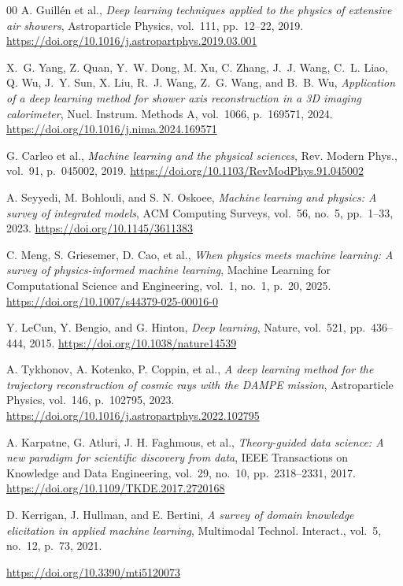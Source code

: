 \documentclass[preprint,12pt]{elsarticle}
\newcommand{\doi}[1]{\url{https://doi.org/#1}}
\begin{document}
\begin{thebibliography}{00}
  A. Guill\'en et al.,
  \textit{Deep learning techniques applied to the physics of extensive air showers},
  Astroparticle Physics, vol.~111, pp.~12--22, 2019.
  \doi{10.1016/j.astropartphys.2019.03.001}

  X.~G. Yang, Z. Quan, Y.~W. Dong, M. Xu, C. Zhang, J.~J. Wang, C.~L. Liao, Q. Wu, J.~Y. Sun, X. Liu, R.~J. Wang, Z.~G. Wang, and B.~B. Wu,
  \textit{Application of a deep learning method for shower axis reconstruction in a 3D imaging calorimeter},
  Nucl. Instrum. Methods A, vol.~1066, p.~169571, 2024.
  \doi{10.1016/j.nima.2024.169571}

  G. Carleo et al.,
  \textit{Machine learning and the physical sciences},
  Rev. Modern Phys., vol.~91, p.~045002, 2019.
  \doi{10.1103/RevModPhys.91.045002}

  A. Seyyedi, M. Bohlouli, and S. N. Oskoee,
  \textit{Machine learning and physics: A survey of integrated models},
  ACM Computing Surveys, vol.~56, no.~5, pp.~1--33, 2023.
  \doi{10.1145/3611383}

  C. Meng, S. Griesemer, D. Cao, et al.,
  \textit{When physics meets machine learning: A survey of physics-informed machine learning},
  Machine Learning for Computational Science and Engineering, vol.~1, no.~1, p.~20, 2025.
  \doi{10.1007/s44379-025-00016-0}

  Y. LeCun, Y. Bengio, and G. Hinton,
  \textit{Deep learning},
  Nature, vol.~521, pp.~436--444, 2015.
  \doi{10.1038/nature14539}

  A. Tykhonov, A. Kotenko, P. Coppin, et al.,
  \textit{A deep learning method for the trajectory reconstruction of cosmic rays with the DAMPE mission},
  Astroparticle Physics, vol.~146, p.~102795, 2023.
  \doi{10.1016/j.astropartphys.2022.102795}

  A. Karpatne, G. Atluri, J. H. Faghmous, et al.,
  \textit{Theory-guided data science: A new paradigm for scientific discovery from data},
  IEEE Transactions on Knowledge and Data Engineering, vol.~29, no.~10, pp.~2318--2331, 2017.
  \doi{10.1109/TKDE.2017.2720168}

  D. Kerrigan, J. Hullman, and E. Bertini,
  \textit{A survey of domain knowledge elicitation in applied machine learning},
  Multimodal Technol. Interact., vol.~5, no.~12, p.~73, 2021.

  \doi{10.3390/mti5120073}


\end{thebibliography}
\end{document}
